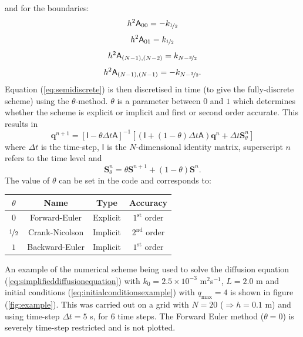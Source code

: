 \documentclass[12pt]{article}
\begin{document}
\clearpage
\noindent
and for the boundaries:
\begin{equation}
\nonumber
h^2\mathsf{A}_{00} = -k_{\nicefrac{1}{2}}
\end{equation}
\begin{equation}
\nonumber
h^2\mathsf{A}_{01} = k_{\nicefrac{1}{2}}
\end{equation}
\begin{equation}
\nonumber
h^2\mathsf{A}_{(N-1),(N-2)} = k_{N-\nicefrac{3}{2}}
\end{equation}
\begin{equation}\label{eq:matrixelementsboundaries}
h^2\mathsf{A}_{(N-1),(N-1)} = -k_{N-\nicefrac{3}{2}}.
\end{equation}
Equation (\ref{eq:semidiscrete}) is then discretised in time (to give the fully-discrete scheme) using the $\theta$-method. $\theta$ is a parameter between $0$ and $1$ which determines whether the scheme is explicit or implicit and first or second order accurate. This results in
\begin{equation}\label{eq:numericalscheme}
\mathbf{q}^{n+1}=\left[\mathsf{I}-\theta\Delta t\mathsf{A}\right]^{-1}\left[\left(\mathsf{I}+(1-\theta)\Delta t\mathsf{A}\right)\mathbf{q}^n + \Delta t\mathbf{S}_\theta^n\right]
\end{equation}
where $\Delta t$ is the time-step, $\mathsf{I}$ is the $N$-dimensional identity matrix, superscript $n$ refers to the time level and
\begin{equation}\label{eq:Stheta}
\mathbf{S}_\theta^n = \theta\mathbf{S}^{n+1}+(1-\theta)\mathbf{S}^n.
\end{equation}
The value of $\theta$ can be set in the code and corresponds to:

\begin{center}
\begin{tabular}{ cccc }
$\theta$ & Name & Type & Accuracy \\
\hline
$0$ & Forward-Euler & Explicit & $1^\mathrm{st}$ order \\
$\nicefrac{1}{2}$ & Crank-Nicolson & Implicit & $2^\mathrm{nd}$ order \\
$1$ & Backward-Euler & Implicit & $1^\mathrm{st}$ order \\
\end{tabular}
\end{center}

An example of the numerical scheme being used to solve the diffusion equation (\ref{eq:simplifieddiffusionequation}) with $k_0=2.5\times 10^{-3}$ m$^2$s$^{-1}$, $L=2.0$ m and initial conditions (\ref{eq:initialconditionsexample}) with $q_\mathrm{max}=4$ is shown in figure (\ref{fig:example}). This was carried out on a grid with $N=20$ ($\Rightarrow h=0.1$ m) and using time-step $\Delta t=5$ s, for $6$ time steps. The Forward Euler method ($\theta=0$) is severely time-step restricted and is not plotted.
\end{document}

